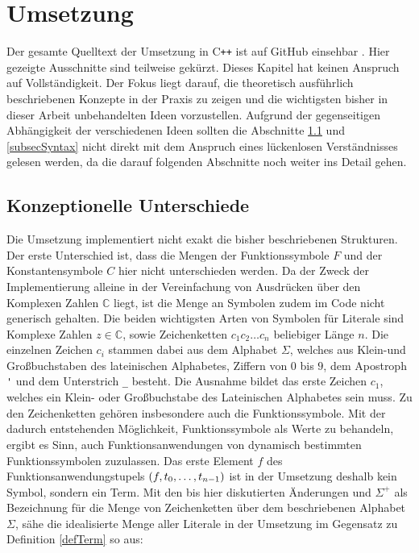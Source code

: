 

\chapter{Umsetzung} \label{secKernUmsetzungInCpp}

Der gesamte Quelltext der Umsetzung in C\texttt{++} ist auf GitHub einsehbar \cite{brunizzl2021Jul}. Hier gezeigte Ausschnitte sind teilweise gekürzt.
Dieses Kapitel hat keinen Anspruch auf Vollständigkeit. Der Fokus liegt darauf, die theoretisch ausführlich beschriebenen Konzepte in der Praxis zu zeigen und die wichtigsten bisher in dieser Arbeit unbehandelten Ideen vorzustellen. Aufgrund der gegenseitigen Abhängigkeit der verschiedenen Ideen sollten die Abschnitte \ref{subsecKonzeptionelleUnterschiede} und \ref{subsecSyntax} nicht direkt mit dem Anspruch eines lückenlosen Verständnisses gelesen werden, da die darauf folgenden Abschnitte noch weiter ins Detail gehen.

\section{Konzeptionelle Unterschiede} \label{subsecKonzeptionelleUnterschiede}
Die Umsetzung implementiert nicht exakt die bisher beschriebenen Strukturen. Der erste Unterschied ist, dass die Mengen der Funktionssymbole $F$ und der Konstantensymbole $C$ hier nicht unterschieden werden. Da der Zweck der Implementierung alleine in der Vereinfachung von Ausdrücken über den Komplexen Zahlen $\mathbb C$ liegt, ist die Menge an Symbolen zudem im Code nicht generisch gehalten. Die beiden wichtigsten Arten von Symbolen für Literale sind Komplexe Zahlen $z \in \mathbb C$, sowie Zeichenketten $c_1 c_2\dots c_n$ beliebiger Länge $n$. Die einzelnen Zeichen $c_i$ stammen dabei aus dem Alphabet $\Sigma$, welches aus Klein-und Großbuchstaben des lateinischen Alphabetes, Ziffern von $0$ bis $9$, dem Apostroph \verb|'| und dem Unterstrich \verb|_| besteht. Die Ausnahme bildet das erste Zeichen $c_1$, welches ein Klein- oder Großbuchstabe des Lateinischen Alphabetes sein muss. Zu den Zeichenketten gehören insbesondere auch die Funktionssymbole. Mit der dadurch entstehenden Möglichkeit, Funktionssymbole als Werte zu behandeln, ergibt es Sinn, auch Funktionsanwendungen von dynamisch bestimmten Funktionssymbolen zuzulassen. Das erste Element $f$ des Funktionsanwendungstupels $(f, {t}_{0}, \dots, {t}_{n-1})$ ist in der Umsetzung deshalb kein Symbol, sondern ein Term. Mit den bis hier diskutierten Änderungen und $\Sigma^+$ als Bezeichnung für die Menge von Zeichenketten über dem beschriebenen Alphabet $\Sigma$, sähe die idealisierte Menge aller Literale in der Umsetzung im Gegensatz zu Definition \ref{defTerm} so aus:

